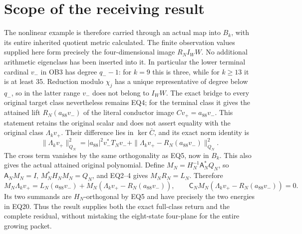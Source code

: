 \documentclass[11pt]{article}
\begin{document}
\section{Scope of the receiving result}
The nonlinear example is therefore carried through an actual map
into $B_k$, with its entire inherited quotient metric calculated.
The finite observation values supplied here form precisely the
four-dimensional image $R_NI_W W$. No additional arithmetic
eigenclass has been inserted into it. In particular the lower
terminal cardinal $v_-$ in OB3 has degree $q_--1$: for $k=9$ this
is three, while for $k\ge13$ it is at least 35. Reduction modulo
$\chi_j$ has a unique representative of degree below $q_-$, so
in the latter range $v_-$ does not belong to $I_WW$. The exact
bridge to every original target class nevertheless remains EQ4;
for the terminal class it gives the attained lift
$R_N(a_{88}v_-)$ of the literal conductor image
$Cv_+=a_{88}v_-$. This statement retains the original scalar and
does not assert equality with the original class $\Lambda_kv_+$.
Their difference lies in $\ker\bar C$, and its exact norm identity is
\[
 \|\Lambda_kv_+\|_{Q_N}^2
 =|a_{88}|^2v_-^*T_Nv_-
   +\|\Lambda_kv_+-R_N(a_{88}v_-)\|_{Q_N}^2.                        \tag{EQ20}
\]
The cross term vanishes by the same orthogonality as EQ5, now in
$B_k$. This also gives the actual attained original polynomial.
Define $M_N=H_N^{-1}\mathsf A_N^*Q_N$, so
$\mathsf A_NM_N=I$, $M_N^*H_NM_N=Q_N$, and EQ2--4 gives
$M_NR_N=L_N$. Therefore
\[
 M_N\Lambda_kv_+
 =L_N(a_{88}v_-)+M_N(\Lambda_kv_+-R_N(a_{88}v_-)),\qquad
 \mathsf C_NM_N(\Lambda_kv_+-R_N(a_{88}v_-))=0.                       \tag{EQ21}
\]
Its two summands are $H_N$-orthogonal by EQ5 and have precisely
the two energies in EQ20. Thus the result supplies both the exact
full-class return and the complete residual, without mistaking the
eight-state four-plane for the entire growing packet.
\end{document}
